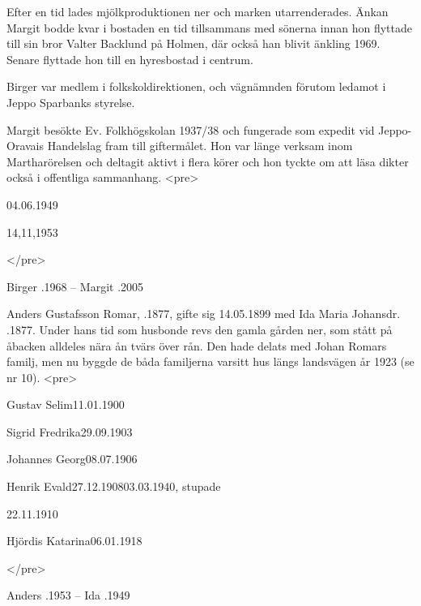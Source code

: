 Efter en tid lades mjölkproduktionen ner och marken utarrenderades. Änkan Margit bodde kvar i bostaden en tid tillsammans med sönerna innan hon flyttade till sin bror Valter Backlund på Holmen, där också han blivit änkling 1969. Senare flyttade hon till en hyresbostad i centrum.

Birger var medlem i folkskoldirektionen, och vägnämnden förutom ledamot i Jeppo Sparbanks styrelse.

Margit besökte Ev. Folkhögskolan 1937/38 och fungerade som expedit vid Jeppo-Oravais Handelslag fram till giftermålet. Hon var länge verksam inom Martharörelsen och deltagit aktivt i flera körer och hon tyckte om att läsa dikter också i offentliga sammanhang.
<pre>
\begin{jhchildren}
  \item{}{04.06.1949}{}
  \item{}{14,11,1953}{}
\end{jhchildren}
</pre>

Birger .1968  --  Margit .2005


Anders Gustafsson Romar, .1877, gifte sig 14.05.1899 med Ida Maria Johansdr. .1877. Under hans tid som husbonde revs den gamla gården ner, som stått på åbacken alldeles nära ån tvärs över rån. Den hade delats med Johan Romars familj, men nu byggde de båda familjerna varsitt hus längs landsvägen år 1923 (se nr 10).
<pre>
\begin{jhchildren}
  \item{Gustav Selim}{11.01.1900}{}
  \item{Sigrid Fredrika}{29.09.1903}{}
  \item{Johannes Georg}{08.07.1906}{}
  \item{Henrik Evald}{27.12.1908}{03.03.1940}, stupade
  \item{}{22.11.1910}{}
  \item{Hjördis Katarina}{06.01.1918}{}
\end{jhchildren}
</pre>

Anders .1953  --  Ida .1949
